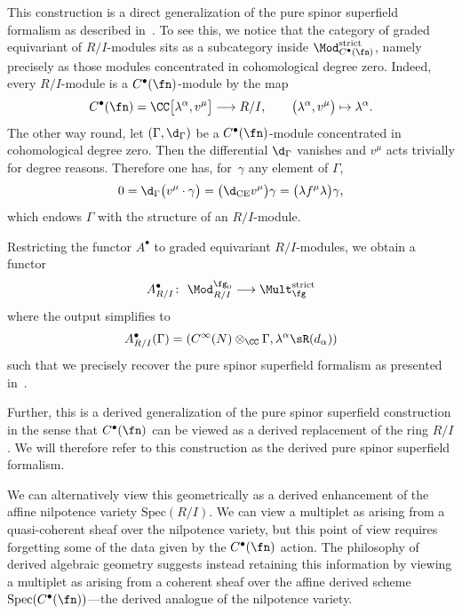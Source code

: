 This construction is a direct generalization of the pure spinor superfield formalism as described in~\cite{perspectives}. To see this, we notice that the category of graded equivariant of $R/I$-modules sits as a subcategory inside $\Mod_{C^\bullet(\fn)}^{\mathrm{strict}}$, namely precisely as those modules concentrated in cohomological degree zero. Indeed, every $R/I$-module is a $C^\bullet(\fn)$-module by the map
\begin{equation*}
C^\bullet(\fn) = \CC\big[\lambda^\alpha,v^\mu\big] \longrightarrow R/I, \qquad \big(\lambda^\alpha , v^\mu\big) \mapsto \lambda^\alpha .
\end{equation*}
The other way round, let $(\Gamma , \d_\Gamma)$ be a $C^\bullet(\fn)$-module concentrated in cohomological degree zero. Then the differential $\d_\Gamma$ vanishes and $v^\mu$ acts trivially for degree reasons. Therefore one has, for~$\gamma$ any element of $\Gamma$,
\begin{equation*}
0 = \d_\Gamma \big(v^\mu \cdot \gamma\big) = \big(\d_{\mathrm{CE}} v^\mu\big) \gamma = \big(\lambda f^\mu \lambda\big) \gamma ,
\end{equation*}
which endows $\Gamma$ with the structure of an $R/I$-module.

Restricting the functor $A^\bullet$ to graded equivariant $R/I$-modules, we obtain a functor
\begin{equation*}
A^\bullet_{R/I} \colon \ \Mod_{R/I}^{\fg_0} \longrightarrow \Mult_{\fg}^{\mathrm{strict}}
\end{equation*}
where the output simplifies to
\begin{equation*}
A^\bullet_{R/I} (\Gamma) = \left( C^\infty(N) \otimes_\CC \Gamma , \lambda^\alpha \sR(d_\alpha) \right)
\end{equation*}
such that we precisely recover the pure spinor superfield formalism as presented in~\cite{perspectives}.

Further, this is a derived generalization of the pure spinor superfield construction in the sense that $C^\bullet(\fn)$ can be viewed as a derived replacement of the ring $R/I$. We will therefore refer to this construction as the derived pure spinor superfield formalism.

\begin{rmk}
	We can alternatively view this geometrically as a derived enhancement of the affine nilpotence variety $\mathrm{Spec}(R/I)$. We can view a multiplet as arising from a quasi-coherent sheaf over the nilpotence variety, but this point of view requires forgetting some of the data given by the $C^\bullet(\fn)$ action. The philosophy of derived algebraic geometry suggests instead retaining this information by viewing a multiplet as arising from a coherent sheaf over the affine derived scheme $\mathrm{Spec}(C^\bullet(\fn))$---the derived analogue of the nilpotence variety.
\end{rmk}

